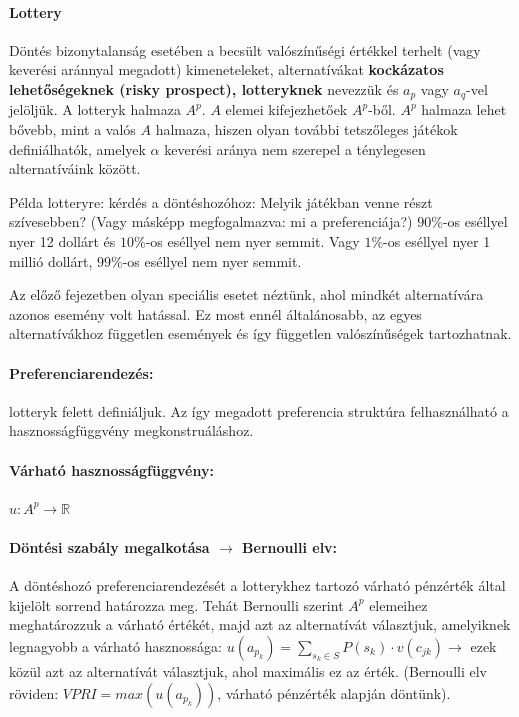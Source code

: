\documentclass[a4paper,12pt]{article}
\begin{document}
\paragraph{Lottery} Döntés bizonytalanság esetében a becsült valószínűségi értékkel terhelt (vagy keverési aránnyal megadott) kimeneteleket, alternatívákat \textbf{kockázatos lehetőségeknek (risky prospect), lotteryknek} nevezzük és $a_p$ vagy $a_q$-vel jelöljük. A lotteryk halmaza $A^p$.  $A$ elemei kifejezhetőek $A^p$-ből. $A^p$ halmaza lehet bővebb, mint a valós $A$ halmaza, hiszen olyan további tetszőleges játékok definiálhatók, amelyek $\alpha$ keverési aránya nem szerepel a ténylegesen alternatíváink között.

Példa lotteryre: kérdés a döntéshozóhoz: Melyik játékban venne részt szívesebben? (Vagy másképp megfogalmazva: mi a preferenciája?) $90\%$-os eséllyel nyer 12 dollárt és $10\%$-os eséllyel nem nyer semmit. Vagy $1\%$-os eséllyel nyer 1 millió dollárt, $99\%$-os eséllyel nem nyer semmit.

Az előző fejezetben olyan speciális esetet néztünk, ahol mindkét alternatívára azonos esemény volt hatással. Ez most ennél általánosabb, az egyes alternatívákhoz független események és így független valószínűségek tartozhatnak.


\paragraph{Preferenciarendezés: } lotteryk felett definiáljuk. Az így megadott preferencia struktúra felhasználható a hasznosságfüggvény megkonstruáláshoz. %

\paragraph{Várható hasznosságfüggvény:}  $u: A^p \rightarrow \mathbb{R}$  %


\paragraph{Döntési szabály megalkotása  $\rightarrow$ Bernoulli elv: } A döntéshozó preferenciarendezését a lotterykhez tartozó várható pénzérték által kijelölt sorrend határozza meg. Tehát Bernoulli szerint $A^p$ elemeihez meghatározzuk a várható értékét, majd azt az alternatívát választjuk, amelyiknek legnagyobb a várható hasznossága: $u(a_{p_k})= \sum_{s_k \in S} P(s_k)\cdot v(c_{jk}) \rightarrow$ ezek közül azt az alternatívát választjuk, ahol maximális ez az érték. (Bernoulli elv röviden: $VPRI=max(u(a_{p_k}))$, várható pénzérték alapján döntünk).
\end{document}
